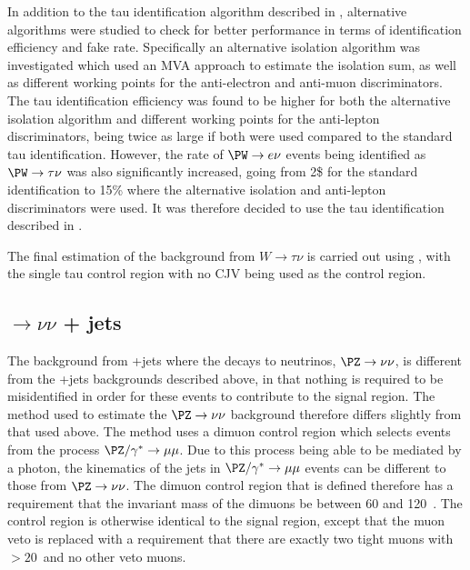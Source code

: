 In addition to the tau identification algorithm described in , alternative algorithms were studied to check for better performance in terms of identification efficiency and fake rate. Specifically an alternative isolation algorithm was investigated which used an \ac{MVA} approach to estimate the isolation sum, as well as different working points for the anti-electron and anti-muon discriminators. The tau identification efficiency was found to be higher for both the alternative isolation algorithm and different working points for the anti-lepton discriminators, being twice as large if both were used compared to the standard tau identification. However, the rate of $\PW\rightarrow e\nu$ events being identified as $\PW\rightarrow\tau\nu$ was also significantly increased, going from 2\$ for the standard identification to 15\% where the alternative isolation and anti-lepton discriminators were used. It was therefore decided to use the tau identification described in .

The final estimation of the background from $W\rightarrow\tau\nu$ is carried out using , with the single tau control region with no \ac{CJV} being used as the control region.


\subsection{\PZ$\rightarrow \nu\nu$ + jets}%
\label{sec:promptznunu}
The background from \PZ+jets where the \PZ decays to neutrinos, $\PZ\rightarrow\nu\nu$, is different from the \PW+jets backgrounds described above, in that nothing is required to be misidentified in order for these events to contribute to the signal region. The method used to estimate the $\PZ\rightarrow\nu\nu$ background therefore differs slightly from that used above. The method uses a dimuon control region which selects events from the process $\PZ/\gamma^{*}\rightarrow\mu\mu$. Due to this process being able to be mediated by a photon, the kinematics of the jets in $\PZ/\gamma^{*}\rightarrow\mu\mu$ events can be different to those from $\PZ\rightarrow\nu\nu$. The dimuon control region that is defined therefore has a requirement that the invariant mass of the dimuons be between 60 and 120 \GeV\,. The control region is otherwise identical to the signal region, except that the muon veto is replaced with a requirement that there are exactly two tight muons with \pt$>20$\GeV\, and no other veto muons.

